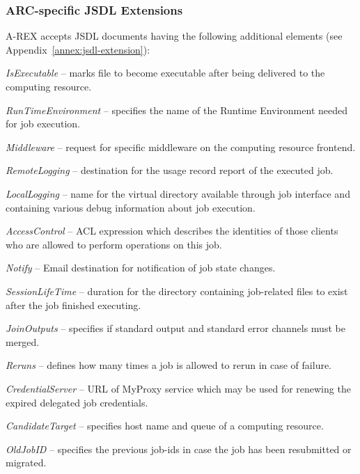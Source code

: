 \documentclass{article}                            %
\begin{document}
\subsubsection{ARC-specific JSDL Extensions}

A-REX accepts JSDL documents having the following additional elements
(see Appendix~\ref{annex:jsdl-extension}):

\begin{list}{--}{\setlength{\labelwidth}{0.5cm}\setlength{\rightmargin}{\leftmargin}}
\item [{\emph{IsExecutable}}] -- marks file to become executable
after being delivered to the computing resource.
\item [{\emph{RunTimeEnvironment}}] -- specifies the name of the Runtime
Environment needed for job execution.
\item [{\emph{Middleware}}] -- request for specific middleware on the computing
resource frontend.
\item [{\emph{RemoteLogging}}] -- destination for the usage record
report of the executed job.
\item [{\emph{LocalLogging}}] -- name for the virtual directory available
through job interface and containing various debug information about
job execution.
\item [{\emph{AccessControl}}] -- ACL expression which describes the identities
of those clients who are allowed to perform operations on this job.
\item [{\emph{Notify}}] -- Email destination for notification of job state
changes.
\item [{\emph{SessionLifeTime}}] -- duration for the directory containing
job-related files to exist after the job finished executing.
\item [{\emph{JoinOutputs}}] -- specifies if standard output and standard
error channels must be merged.
\item [{\emph{Reruns}}] -- defines how many times a job is allowed
to rerun in case of failure.
\item [{\emph{CredentialServer}}] -- URL of MyProxy service which
may be used for renewing the expired delegated job credentials.
\item [{\emph{CandidateTarget}}] -- specifies host name and queue
of a computing resource.
\item [{\emph{OldJobID}}] -- specifies the previous job-ids in case the job 
has been resubmitted or migrated.
\end{list}
\end{document}
